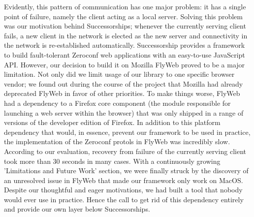 Evidently, this pattern of communication has one major problem: it has a single point of failure, namely the client acting as a local server. 
Solving this problem was our motivation behind Successorships; whenever the currently serving client fails, a new client in the network is elected as the new server and connectivity in the network is re-established automatically.
Successorship provides a framework to build fault-tolerant Zeroconf web applications with an easy-to-use JavaScript API.
However, our decision to build it on Mozilla FlyWeb proved to be a major limitation.
Not only did we limit usage of our library to one specific browser vendor; we found out during the course of the project that Mozilla had already deprecated FlyWeb in favor of other priorities.
To make things worse, FlyWeb had a dependency to a Firefox core component (the module responsible for launching a web server within the browser) that was only shipped in a range of versions of the developer edition of Firefox.
In addition to this platform dependency that would, in essence, prevent our framework to be used in practice, the implementation of the Zeroconf protols in FlyWeb was incredibly slow.
According to our evaluation, recovery from failure of the currently serving client took more than 30 seconds in many cases.
With a continuously growing 'Limitations and Future Work' section, we were finally struck by the discovery of an unresolved issue in FlyWeb that made our framework only work on MacOS.
Despite our thoughtful and eager motivations, we had built a tool that nobody would ever use in practice.
Hence the call to get rid of this dependency entirely and provide our own layer below  Successorships.

